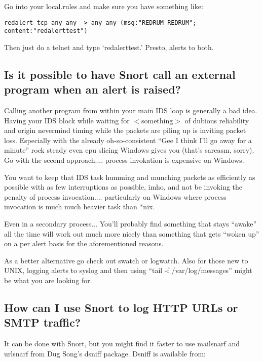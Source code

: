 \documentclass{article}
\begin{document}
Go into your local.rules and make sure you have something like:

\begin{verbatim}
redalert tcp any any -> any any (msg:"REDRUM REDRUM"; content:"redalerttest")
\end{verbatim}

Then just do a telnet and type `redalerttest.'  Presto, alerts to both.

\subsection{Is it possible to have Snort call an external program when an alert is raised?}

Calling another program from within your main IDS loop is
generally a bad idea.  Having your IDS block while waiting
for $<$something$>$ of dubious reliability and origin nevermind
timing while the packets are piling up is inviting packet loss.
Especially with the already oh-so-consistent ``Gee I think
I'll go away for a minute'' rock steady even cpu slicing
Windows gives you (that's sarcasm, sorry). Go  with the
second approach.... process invokation is expensive on 
Windows.

You want to keep that IDS task humming and munching
packets as efficiently as possible with as few interruptions
as possible, imho, and not be invoking the penalty of
process invocation.... particularly on Windows where
process invocation is much much heavier task than *nix.

Even in a secondary process... You'll probably find
something that stays ``awake'' all the time will work out
much more nicely than something that gets ``woken up''
on a per alert basis for the aforementioned reasons.
  
As a better alternative go check out swatch or logwatch.
Also for those new to UNIX, logging alerts to syslog and then using 
``tail -f /var/log/messages'' might be what you are looking for.

\subsection{How can I use Snort to log HTTP URLs or SMTP traffic?}

It can be done with Snort, but you might find it faster to use mailsnarf and
urlsnarf from Dug Song's dsniff package. Dsniff is available from:

\end{document}
